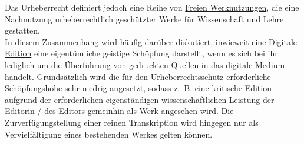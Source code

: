 \documentclass{article}
\begin{document}
        Das Urheberrecht definiert jedoch eine Reihe von \href{http://gams.uni-graz.at/o:konde.222}{Freien Werknutzungen}, die eine Nachnutzung urheberrechtlich geschützter Werke für Wissenschaft und Lehre gestatten.\\
            
        In diesem Zusammenhang wird häufig darüber diskutiert, inwieweit eine \href{http://gams.uni-graz.at/o:konde.59}{Digitale Edition} eine eigentümliche geistige Schöpfung darstellt, wenn es sich bei ihr lediglich um die Überführung von gedruckten Quellen in das digitale Medium handelt. Grundsätzlich wird die für den Urheberrechtsschutz erforderliche Schöpfungshöhe sehr niedrig angesetzt, sodass z. B. eine kritische Edition aufgrund der erforderlichen eigenständigen wissenschaftlichen Leistung der Editorin / des Editors gemeinhin als Werk angesehen wird. Die Zurverfügungstellung einer reinen Transkription wird hingegen nur als Vervielfältigung eines bestehenden Werkes gelten können. \\
            
\end{document}

